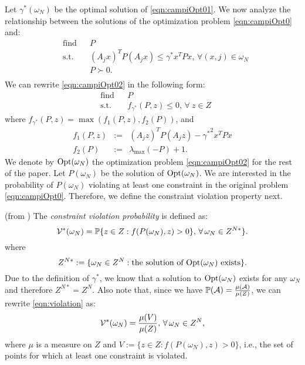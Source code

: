 Let $\gamma^*(\omega_N)$ be the optimal solution of \eqref{eqn:campiOpt01}. We now analyze the relationship between the solutions of the optimization problem \eqref{eqn:campiOpt0} and:
\begin{equation}\label{eqn:campiOpt02}
\begin{aligned}
& \text{find} & & P \\
& \text{s.t.} 
&  & (A_j x)^TP(A_j x) \leq \gamma^* x^TPx,\,\forall (x, j) \in \omega_N \\
& && P \succ 0. \\
\end{aligned}
\end{equation}
We can rewrite \eqref{eqn:campiOpt02} in the following form:
\begin{equation}
\label{eqn:campiOpt2}
\begin{aligned}
& \text{find} & & P \\
& \text{s.t.} 
& & f_{\gamma^*}(P, z) \leq 0,\,\forall\ z \in Z\end{aligned}
\end{equation}
where $f_{\gamma^*}(P,z) = \max(f_1(P, z), f_2(P))$, and 
\begin{eqnarray*}
f_1(P, z) &:=& (A_j z)^TP(A_j z) - {\gamma^*}^2 x^TPx \\
f_2(P) &:=& \lambda_{\max}(-P) +1.
\end{eqnarray*}
We denote by  $\text{Opt}(\omega_N)$ the optimization problem \eqref{eqn:campiOpt02} for the rest of the paper. Let $P(\omega_N)$ be the solution of $\text{Opt}(\omega_N)$. We are interested in the probability of $P(\omega_N)$ violating at least one constraint in the original problem \eqref{eqn:campiOpt0}. Therefore, we define the constraint violation property next.

\begin{definition}(from \cite{campi}) The \emph{constraint violation probability} is defined as:
\begin{equation}\label{eqn:violation}
\mathcal{V}^*(\omega_N)=
      \mathbb{P}\{z \in Z: f(P(\omega_N), z) > 0\},\, \forall\, \omega_N \in Z^{N*}\}.
\end{equation}
where $$Z^{N*}:=\{\omega_N \in Z^N: \text{the solution of $\text{Opt}(\omega_N)$ exists}\}.$$ 
Due to the definition of $\gamma^*$, we know that a solution to $\text{Opt}(\omega_N)$ exists for any $\omega_N$ and therefore $Z^{N*} = Z^N$. Also note that, since we have $\mathbb{P}(\mathcal{A}) = \frac{\mu(\mathcal{A})}{\mu(Z)}$, we can rewrite \eqref{eqn:violation} as:
\begin{equation*}
\mathcal{V}^*(\omega_N)=
      \frac{\mu(V)}{\mu(Z)},\, \forall\, \omega_N \in Z^N,
\end{equation*}
where $\mu$ is a measure on $Z$ and $V:=\{z \in Z: f(P(\omega_N), z) > 0\}$, i.e., the set of points for which at least one constraint is violated.
\end{definition}

